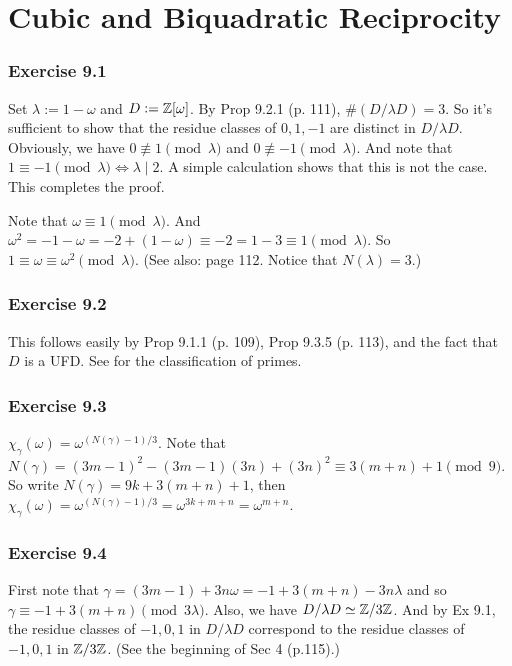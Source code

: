 \documentclass[../I&R.tex]{subfiles}
\begin{document}
\chapter{Cubic and Biquadratic Reciprocity}

\subsection*{Exercise 9.1}

Set $\lambda:=1-\omega$ and $D:=\mathbb{Z}[\omega]$. By Prop 9.2.1 (p. 111), $\#(D/\lambda D)=3$. So it's sufficient to show that the residue classes of $0,1,-1$ are distinct in $D/\lambda D$. Obviously, we have $0\not\equiv1\pmod{\lambda}$ and $0\not\equiv-1\pmod{\lambda}$. And note that $1\equiv-1\pmod{\lambda} \iff \lambda\mid2$. A simple calculation shows that this is not the case. This completes the proof.

Note that $\omega\equiv1\pmod{\lambda}$. And $\omega^2=-1-\omega=-2+(1-\omega)\equiv-2=1-3\equiv1\pmod{\lambda}$. So $1\equiv\omega\equiv\omega^2\pmod{\lambda}$. (See also: page 112. Notice that $N(\lambda)=3$.)

\subsection*{Exercise 9.2}

This follows easily by Prop 9.1.1 (p. 109), Prop 9.3.5 (p. 113), and the fact that $D$ is a UFD. See  for the classification of primes.

\subsection*{Exercise 9.3}

$\chi_\gamma(\omega)=\omega^{(N(\gamma)-1)/3}$. Note that $N(\gamma)=(3m-1)^2-(3m-1)(3n)+(3n)^2\equiv3(m+n)+1\pmod{9}$. So write $N(\gamma)=9k+3(m+n)+1$, then $\chi_\gamma(\omega)=\omega^{(N(\gamma)-1)/3}=\omega^{3k+m+n}=\omega^{m+n}$.

\subsection*{Exercise 9.4}

First note that $\gamma=(3m-1)+3n\omega=-1+3(m+n)-3n\lambda$ and so $\gamma\equiv-1+3(m+n) \pmod{3\lambda}$. Also, we have $D/\lambda D\simeq \mathbb{Z}/3\mathbb{Z}$. And by Ex 9.1, the residue classes of $-1,0,1$ in $D/\lambda D$ correspond to the residue classes of $-1,0,1$ in $\mathbb{Z}/3\mathbb{Z}$. (See the beginning of Sec 4 (p.115).)
\end{document}
